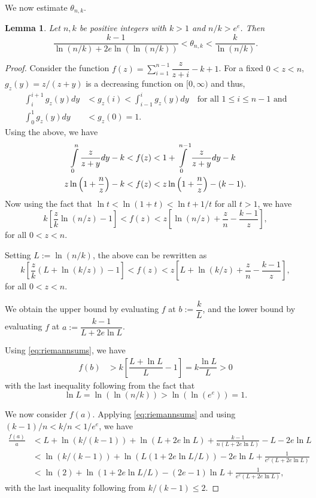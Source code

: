 \documentclass{amsart}
\newtheorem{lem}[thm]{Lemma}
\begin{document}
We now estimate $\theta_{n,k}$.
\begin{lem}\label{lem:thetabound}
Let $n,k$ be positive integers with $k>1$ and $n/k>e^{e}$. Then \[ \dfrac{k-1}{\ln(n/k)+2e\ln(\ln(n/k))}<\theta_{n,k}< \dfrac{k}{\ln(n/k)}.\]    
\end{lem}
\begin{proof}
Consider the function $f(z)=\sum\limits_{i=1}^{n-1} \dfrac{z}{z+i}-k+1$. For a fixed $0<z<n$, $g_{z}(y)=z/(z+y)$ is a decreasing function on $[0,\infty)$ and thus, 
\begin{align*}
\int_{i}^{i+1}g_{z}(y) dy &< g_{z}(i)<\int_{i-1}^{i}g_{z}(y)dy \quad \text{for all $1\leq i\leq n-1$ and}\\
\int_{0}^{1}g_{z}(y)dy &< g_{z}(0)=1.
\end{align*}
Using the above, we have
\begin{align}\label{eq:rsum} 
\int\limits_{0}^{n} \dfrac{z}{z+y} dy -k  <f(z) &< 1+\int\limits_{0}^{n-1} \dfrac{z}{z+y} dy -k \notag \\
z\ln\left(1 + \dfrac{n}{z}\right) -k < f(z) &<  z\ln\left(1 + \dfrac{n}{z}\right) - (k-1).
\end{align}
Now using the fact that $\ln t<\ln(1+t)<\ln t +1/t$ for all $t>1$, we have 
\begin{equation} \label{eq:riemannsums0}
 k\left[ \dfrac{z}{k}\ln(n/z)- 1\right] <f(z) < z \left[\ln(n/z) + \dfrac{z}{n} -\dfrac{k-1}{z}   \right],
\end{equation}
for all $0<z<n$.

Setting $L:=\ln(n/k)$, the above can be rewritten as
\begin{equation} \label{eq:riemannsums}
 k\left[ \dfrac{z}{k}(L+\ln(k/z))- 1\right] <f(z) < z \left[L+\ln(k/z) + \dfrac{z}{n} -\dfrac{k-1}{z}   \right],   
\end{equation}
for all $0<z<n$.

We obtain the upper bound by evaluating $f$ at $b:=\dfrac{k}{L}$, and the lower bound by evaluating $f$ at $a:=\dfrac{k-1}{L+2e\ln L}$. 

Using \eqref{eq:riemannsums}, we have 
\begin{align*}
 f(b) &> k \left[ \dfrac{L+\ln L}{L}- 1\right]=k \dfrac{\ln L}{L}>0
\end{align*}
with the last inequality following from the fact that \[\ln L=\ln(\ln(n/k))>\ln(\ln(e^{e}))=1.\]

We now consider $f(a)$.
Applying \eqref{eq:riemannsums} and using $(k-1)/n<k/n<1/e^{e}$, we have
\begin{align*}
\frac{f(a)}{a} &< L+ \ln(k/(k-1)) +\ln(L+2e\ln L) +\frac{k-1}{n (L+2e\ln L)} -L-2e\ln L \\
&< \ln(k/(k-1))+\ln(L(1+2e\ln L/L))-2e\ln L + \frac{1}{e^{e}(L+2e\ln L)}\\
&< \ln(2) + \ln(1+2e\ln L/L) -(2e-1)\ln L + \frac{1}{e^{e}(L+2e\ln L)},
\end{align*}
with the last inequality following from $k/(k-1) \leq 2$.


\end{proof}
\end{document}
